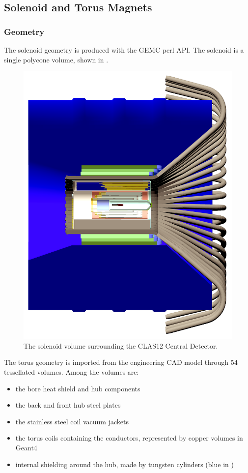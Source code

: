 \subsection{Solenoid and Torus Magnets}


\subsubsection{Geometry}
The solenoid geometry is produced with the GEMC perl API. The solenoid is a single polycone volume, shown in .
\begin{figure}[h]
	\centering
	\includegraphics[width=0.99\columnwidth,keepaspectratio]{img/solenoid.png}
    \caption{The solenoid volume surrounding the CLAS12 Central Detector.}
	\label{fig:solenoid}
\end{figure}

The torus geometry is imported from the engineering CAD model through 54 tessellated volumes. Among the volumes are:

\begin{itemize}
	\item the bore heat shield and hub components
	\item the back and front hub steel plates
	\item the stainless steel coil vacuum jackets
	\item the torus coils containing the conductors, represented by copper volumes in Geant4
	\item internal shielding around the hub, made by tungsten cylinders (blue in )
\end{itemize}

